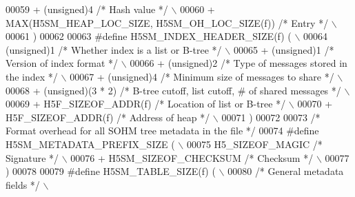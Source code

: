 \begin{DoxyCode}
00059 \textcolor{preprocessor}{        + (unsigned)4           }\textcolor{comment}{/* Hash value */}\textcolor{preprocessor}{                              \(\backslash\)}
00060 \textcolor{preprocessor}{        + MAX(H5SM\_HEAP\_LOC\_SIZE, H5SM\_OH\_LOC\_SIZE(f))  }\textcolor{comment}{/* Entry */}\textcolor{preprocessor}{           \(\backslash\)}
00061 \textcolor{preprocessor}{    )}
00062 
00063 \textcolor{preprocessor}{#define H5SM\_INDEX\_HEADER\_SIZE(f) (                                           \(\backslash\)}
00064 \textcolor{preprocessor}{        (unsigned)1             }\textcolor{comment}{/* Whether index is a list or B-tree */}\textcolor{preprocessor}{       \(\backslash\)}
00065 \textcolor{preprocessor}{        + (unsigned)1           }\textcolor{comment}{/* Version of index format */}\textcolor{preprocessor}{                 \(\backslash\)}
00066 \textcolor{preprocessor}{        + (unsigned)2           }\textcolor{comment}{/* Type of messages stored in the index */}\textcolor{preprocessor}{    \(\backslash\)}
00067 \textcolor{preprocessor}{        + (unsigned)4           }\textcolor{comment}{/* Minimum size of messages to share */}\textcolor{preprocessor}{       \(\backslash\)}
00068 \textcolor{preprocessor}{        + (unsigned)(3 * 2)     }\textcolor{comment}{/* B-tree cutoff, list cutoff, # of shared messages */}\textcolor{preprocessor}{ \(\backslash\)}
00069 \textcolor{preprocessor}{        + H5F\_SIZEOF\_ADDR(f)    }\textcolor{comment}{/* Location of list or B-tree */}\textcolor{preprocessor}{              \(\backslash\)}
00070 \textcolor{preprocessor}{        + H5F\_SIZEOF\_ADDR(f)    }\textcolor{comment}{/* Address of heap */}\textcolor{preprocessor}{                         \(\backslash\)}
00071 \textcolor{preprocessor}{    )}
00072 
00073 \textcolor{comment}{/* Format overhead for all SOHM tree metadata in the file */}
00074 \textcolor{preprocessor}{#define H5SM\_METADATA\_PREFIX\_SIZE (                                           \(\backslash\)}
00075 \textcolor{preprocessor}{    H5\_SIZEOF\_MAGIC             }\textcolor{comment}{/* Signature */}\textcolor{preprocessor}{                               \(\backslash\)}
00076 \textcolor{preprocessor}{    + H5SM\_SIZEOF\_CHECKSUM      }\textcolor{comment}{/* Checksum */}\textcolor{preprocessor}{                                \(\backslash\)}
00077 \textcolor{preprocessor}{    )}
00078 
00079 \textcolor{preprocessor}{#define H5SM\_TABLE\_SIZE(f) (                                                  \(\backslash\)}
00080 \textcolor{preprocessor}{    }\textcolor{comment}{/* General metadata fields */}\textcolor{preprocessor}{                                             \(\backslash\)}

\end{DoxyCode}
